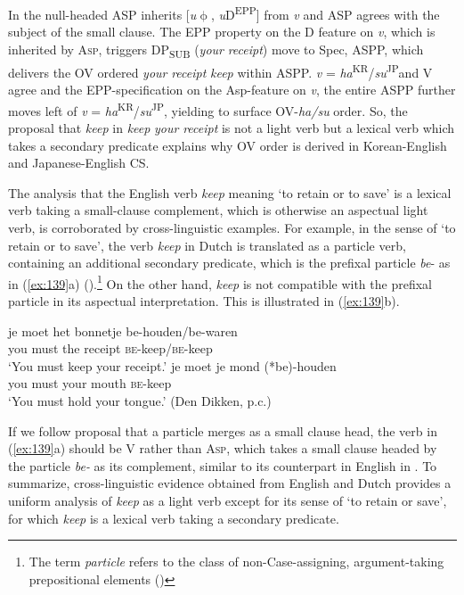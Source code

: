 In  the null-headed \ac{ASP} inherits [\textit{u}$\upphi$, \textit{u}D\textsuperscript{EPP}] from \textit{v} and \ac{ASP} agrees with the subject of the small clause. The \ac{EPP} property on the D feature on \textit{v}, which is inherited by A\textsc{sp,} triggers DP\textsubscript{\MakeUppercase{sub}} (\textit{your} \textit{receipt}) move to Spec, \ac{ASP}P, which delivers the \ac{OV} ordered \textit{your} \textit{receipt} \textit{keep} within \ac{ASP}P.  \textit{v} = \textit{ha}\textsuperscript{\MakeUppercase{kr}}/\textit{su}\textsuperscript{\MakeUppercase{jp}}and V agree and the \ac{EPP}-specification on the Asp-feature on \textit{v}, the entire \ac{ASP}P further moves left of \textit{v} = \textit{ha}\textsuperscript{\MakeUppercase{kr}}/\textit{su}\textsuperscript{\MakeUppercase{jp}}, yielding to surface \ac{OV}-\textit{ha/su} order. So, the proposal that \textit{keep} in \textit{keep} \textit{your} \textit{receipt} is not a light verb but a lexical verb which takes a secondary predicate explains why \ac{OV} order is derived in Korean-English and Japanese-English \ac{CS}. 

The analysis that the English verb \textit{keep} meaning `to retain or to save' is a lexical verb taking a small-clause complement, which is otherwise an aspectual light verb, is corroborated by cross-linguistic examples. For example, in the sense of ‘to retain or to save’, the verb \textit{keep} in Dutch is translated as a particle verb, containing an additional secondary predicate, which is the prefixal particle \textit{be}- as in (\ref{ex:139}a) (\citealt{HoesktraEtAl1987}).\footnote{\textrm{The term} \textrm{\textit{particle}} \textrm{refers to the class of non-Case-assigning, argument-taking prepositional elements (\citealt[33,~fn 31]{DenDikken1995})}} On the other hand, \textit{keep} is not compatible with the prefixal particle in its aspectual interpretation. This is illustrated in (\ref{ex:139}b).

\ea\label{ex:139}
    \ea \gll je    moet het bonnetje be-houden/be-waren \\
    you must the receipt   \textsc{be}-keep/\textsc{be}-keep \\
    \glt `You must keep your receipt.'
    \ex \gll je    moet je   mond (*be)-houden \\
    you must your mouth \textsc{be}-keep \\
    \glt `You must hold your tongue.'     \hfill (Den Dikken, p.c.)
    \z
\z


If we follow  proposal that a particle merges as a small clause head, the verb in (\ref{ex:139}a) should be V rather than \textsc{Asp}, which takes a small clause headed by the particle \textit{be-} as its complement, similar to its counterpart in English in . To summarize, cross-linguistic evidence obtained from English and Dutch provides a uniform analysis of \textit{keep} as a light verb except for its sense of ‘to retain or save’, for which \textit{keep} is a lexical verb taking a secondary predicate. 

